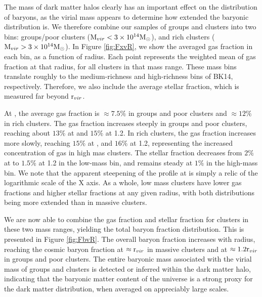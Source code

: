 

The mass of dark matter halos clearly has an important effect on the
distribution of baryons, as the virial mass appears to determine how
extended the baryonic distribution is. We therefore combine our
samples of groups and clusters into two bins: groups/poor clusters
($\textrm{M\ensuremath{_{vir}}}{}<3\times 10^{14}\textrm{M}_\odot$), and rich clusters
($\textrm{M\ensuremath{_{vir}}}{}>3\times 10^{14}\textrm{M}_\odot$). In Figure \ref{fig:FxvR}, we show the
averaged gas fraction in each bin, as a function of radius. Each point
represents the weighted mean of gas fraction at that radius, for all
clusters in that mass range. These mass bins translate roughly to
the medium-richness and high-richness bins of BK14,
respectively. Therefore, we also include the average stellar fraction,
which is measured far beyond $\textrm{r\ensuremath{_{vir}}}$.



At \rfive{}, the average gas fraction is $\approx7.5\%$ in groups and
poor clusters and $\approx12\%$ in rich clusters. The gas fraction
increases steeply in groups and poor clusters, reaching about $13\%$
at \rvir{} and $15\%$ at 1.2\rvir{}. In rich clusters, the gas
fraction increases more slowly, reaching $15\%$ at \rvir{}, and $16\%$
at 1.2\rvir{}, representing the increased concentration of gas in high
mas clusters. The stellar fraction decreases from $2\%$ at \rfive{} to
$1.5\%$ at 1.2\rvir{} in the low-mass bin, and remains steady at $1\%$
in the high-mass bin. We note that the apparent steepening of the
\fg{} profile at \rvir{} is simply a relic of the logarithmic scale of
the X axis. As a whole, low mass clusters have lower gas fractions and
higher stellar fractions at any given radius, with both distributions
being more extended than in massive clusters.

We are now able to combine the gas fraction and stellar fraction for
clusters in these two mass ranges, yielding the total baryon fraction
distribution. This is presented in Figure \ref{fig:FbvR}. The overall
baryon fraction increases with radius, reaching the cosmic baryon
fraction at $\approx\textrm{r\ensuremath{_{vir}}}{}$ in massive clusters and at
$\approx1.2\textrm{r\ensuremath{_{vir}}}{}$ in groups and poor clusters. The entire baryonic
mass associated with the virial mass of groups and clusters is detected
or inferred within the dark matter halo, indicating that the baryonic
matter content of the universe is a strong proxy for the dark matter
distribution, when averaged on appreciably large scales.



